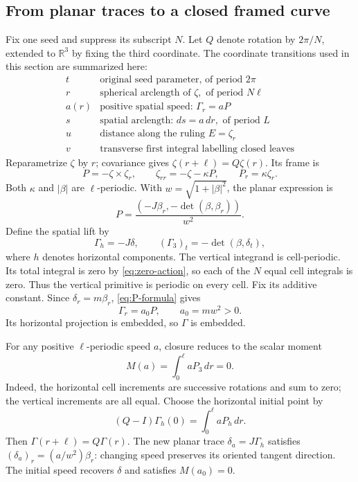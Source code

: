 \documentclass[11pt]{amsart}
\theoremstyle{definition}
\theoremstyle{remark}
\newcommand{\R}{\mathbb R}\newcommand{\Sph}{\mathbb S}
\numberwithin{equation}{section}
\begin{document}
\subsection{From planar traces to a closed framed curve}\label{sec:model-curve}
Fix one seed and suppress its subscript $N$. Let $Q$ denote rotation by
$2\pi/N$, extended to $\R^3$ by fixing the third coordinate. The
coordinate transitions used in this section are summarized here:
\[
\begin{array}{c|l}
 t & \text{original seed parameter, of period }2\pi\\
 r & \text{spherical arclength of }\zeta,\text{ of period }N\ell\\
 a(r) & \text{positive spatial speed: }\Gamma_r=aP\\
 s & \text{spatial arclength: }ds=a\,dr,\text{ of period }L\\
 u & \text{distance along the ruling }E=\zeta_r\\
 v & \text{transverse first integral labelling closed leaves}
\end{array}
\]
Reparametrize $\zeta$ by $r$; covariance gives
$\zeta(r+\ell)=Q\zeta(r)$. Its frame is
\begin{equation}\label{eq:spherical-frame}
 P=-\zeta\times\zeta_r,\qquad
 \zeta_{rr}=-\zeta-\kappa P,\qquad P_r=\kappa\zeta_r.
\end{equation}
Both $\kappa$ and $|\beta|$ are $\ell$-periodic. With
$w=\sqrt{1+|\beta|^2}$, the planar expression is
\begin{equation}\label{eq:P-formula}
 P=\frac{(-J\beta_r,-\det(\beta,\beta_r))}{w^2}.
\end{equation}
Define the spatial lift by
\begin{equation}\label{eq:spatial-lift}
 \Gamma_h=-J\delta,\qquad
 (\Gamma_3)_t=-\det(\beta,\delta_t),
\end{equation}
where $h$ denotes horizontal components. The vertical integrand is
cell-periodic. Its total integral is zero by \eqref{eq:zero-action}, so
each of the $N$ equal cell integrals is zero. Thus the vertical primitive
is periodic on every cell. Fix its additive constant. Since
$\delta_r=m\beta_r$, \eqref{eq:P-formula} gives
\begin{equation}\label{eq:initial-speed}
 \Gamma_r=a_0P,\qquad a_0=mw^2>0.
\end{equation}
Its horizontal projection is embedded, so $\Gamma$ is embedded.

For any positive $\ell$-periodic speed $a$, closure reduces to the scalar
moment
\begin{equation}\label{eq:closing-moment}
 M(a)=\int_0^\ell aP_3\,dr=0.
\end{equation}
Indeed, the horizontal cell increments are successive rotations and
sum to zero; the vertical increments are all equal. Choose the horizontal
initial point by
\begin{equation}\label{eq:covariant-start}
 (Q-I)\Gamma_h(0)=\int_0^\ell aP_h\,dr.
\end{equation}
Then $\Gamma(r+\ell)=Q\Gamma(r)$. The new planar trace
$\delta_a=J\Gamma_h$ satisfies $(\delta_a)_r=(a/w^2)\beta_r$:
changing speed preserves its oriented tangent direction. The initial
speed recovers $\delta$ and satisfies $M(a_0)=0$.
\end{document}
